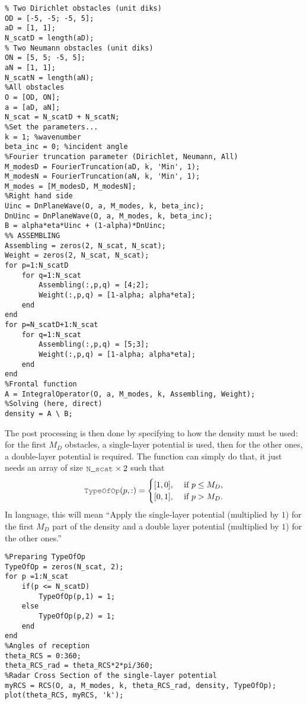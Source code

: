 \begin{lstlisting}
% Two Dirichlet obstacles (unit diks)
OD = [-5, -5; -5, 5];
aD = [1, 1];
N_scatD = length(aD);
% Two Neumann obstacles (unit diks)
ON = [5, 5; -5, 5];
aN = [1, 1];
N_scatN = length(aN);
%All obstacles
O = [OD, ON];
a = [aD, aN];
N_scat = N_scatD + N_scatN;
%Set the parameters...
k = 1; %wavenumber
beta_inc = 0; %incident angle
%Fourier truncation parameter (Dirichlet, Neumann, All)
M_modesD = FourierTruncation(aD, k, 'Min', 1);
M_modesN = FourierTruncation(aN, k, 'Min', 1);
M_modes = [M_modesD, M_modesN];
%Right hand side
Uinc = DnPlaneWave(O, a, M_modes, k, beta_inc);
DnUinc = DnPlaneWave(O, a, M_modes, k, beta_inc);
B = alpha*eta*Uinc + (1-alpha)*DnUinc;
%% ASSEMBLING
Assembling = zeros(2, N_scat, N_scat);
Weight = zeros(2, N_scat, N_scat);
for p=1:N_scatD
	for q=1:N_scat
		Assembling(:,p,q) = [4;2];
		Weight(:,p,q) = [1-alpha; alpha*eta];
	end
end
for p=N_scatD+1:N_scat
	for q=1:N_scat
		Assembling(:,p,q) = [5;3];
		Weight(:,p,q) = [1-alpha; alpha*eta];
	end
end
%Frontal function
A = IntegralOperator(O, a, M_modes, k, Assembling, Weight);
%Solving (here, direct)
density = A \ B;
\end{lstlisting}

The post processing is then done by specifying to \mudiff how the density must be used: for the first $M_D$ obstacles, a single-layer potential is used, then for the other ones, a double-layer potential is required. The \RCS function can simply do that, it just needs an array  of size $\code{N\_scat}\times 2$ such that
$$
\code{TypeOfOp}(p,:) = \begin{cases}
[1,0], &\text{ if } p \leq M_D,\\
[0,1], &\text{ if } p > M_D.
\end{cases}
$$
In \mudiff language, this will mean ``Apply the single-layer potential (multiplied by $1$) for the first $M_D$ part of the density and a double layer potential (multiplied by $1$) for the other ones.''
\begin{lstlisting}
%Preparing TypeOfOp
TypeOfOp = zeros(N_scat, 2);
for p =1:N_scat
	if(p <= N_scatD)
		TypeOfOp(p,1) = 1;
	else
		TypeOfOp(p,2) = 1;
	end
end
%Angles of reception
theta_RCS = 0:360;
theta_RCS_rad = theta_RCS*2*pi/360;
%Radar Cross Section of the single-layer potential
myRCS = RCS(O, a, M_modes, k, theta_RCS_rad, density, TypeOfOp);
plot(theta_RCS, myRCS, 'k');
\end{lstlisting}



